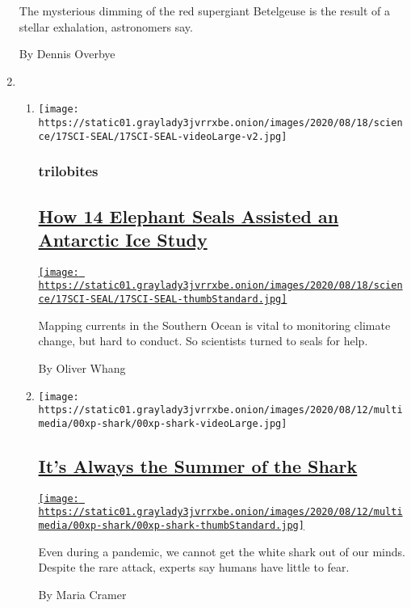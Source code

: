 \begin{enumerate}
  The mysterious dimming of the red supergiant Betelgeuse is the result
  of a stellar exhalation, astronomers say.

  By Dennis Overbye
\item
  \begin{enumerate}
  \def\labelenumii{\arabic{enumii}.}
  \item
    \texttt{[image: https://static01.graylady3jvrrxbe.onion/images/2020/08/18/science/17SCI-SEAL/17SCI-SEAL-videoLarge-v2.jpg]}

    \hypertarget{trilobites-1}{%
    \subsubsection{trilobites}\label{trilobites-1}}

    \hypertarget{how-14-elephant-seals-assisted-an-antarctic-ice-study}{%
    \subsection{\texorpdfstring{\href{/2020/08/14/science/antarctica-ocean-ice-seals.html}{How
    14 Elephant Seals Assisted an Antarctic Ice
    Study}}{How 14 Elephant Seals Assisted an Antarctic Ice Study}}\label{how-14-elephant-seals-assisted-an-antarctic-ice-study}}

    \href{/2020/08/14/science/antarctica-ocean-ice-seals.html}{\texttt{[image: https://static01.graylady3jvrrxbe.onion/images/2020/08/18/science/17SCI-SEAL/17SCI-SEAL-thumbStandard.jpg]}}

    Mapping currents in the Southern Ocean is vital to monitoring
    climate change, but hard to conduct. So scientists turned to seals
    for help.

    By Oliver Whang
  \item
    \texttt{[image: https://static01.graylady3jvrrxbe.onion/images/2020/08/12/multimedia/00xp-shark/00xp-shark-videoLarge.jpg]}

    \hypertarget{its-always-the-summer-of-the-shark}{%
    \subsection{\texorpdfstring{\href{/2020/08/14/science/great-white-shark.html}{It's
    Always the Summer of the
    Shark}}{It's Always the Summer of the Shark}}\label{its-always-the-summer-of-the-shark}}

    \href{/2020/08/14/science/great-white-shark.html}{\texttt{[image: https://static01.graylady3jvrrxbe.onion/images/2020/08/12/multimedia/00xp-shark/00xp-shark-thumbStandard.jpg]}}

    Even during a pandemic, we cannot get the white shark out of our
    minds. Despite the rare attack, experts say humans have little to
    fear.

    By Maria Cramer
  \end{enumerate}
\end{enumerate}

